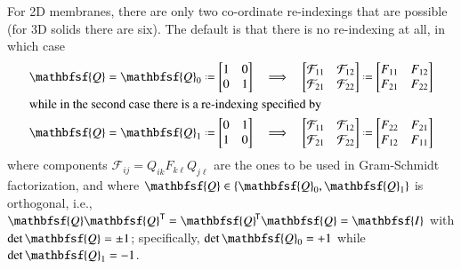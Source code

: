 For 2D membranes, there are only two co-ordinate re-indexings that are possible (for 3D solids there are six).  The default is that there is no re-indexing at all, in which case 
\begin{subequations}
	\label{membraneRelabling}
	\begin{align}
	\mathbfsf{Q} = \mathbfsf{Q}_0 & \defeq 
	\begin{bmatrix} 1 & 0 \\ 0 & 1 \end{bmatrix} & 
	\implies & & \begin{bmatrix}
	\mathcal{F}_{11} & \mathcal{F}_{12} \\
	\mathcal{F}_{21} & \mathcal{F}_{22}
	\end{bmatrix} & \defeq \begin{bmatrix}
	F_{11} & F_{12} \\
	F_{21} & F_{22}
	\end{bmatrix} \label{Q0} \\
	\intertext{while in the second case there is a re-indexing specified by}
	\mathbfsf{Q} = \mathbfsf{Q}_1 & \defeq 
	\begin{bmatrix} 0 & 1 \\ 1 & 0 \end{bmatrix} & 
	\implies & & \begin{bmatrix}
	\mathcal{F}_{11} & \mathcal{F}_{12} \\
	\mathcal{F}_{21} & \mathcal{F}_{22}
	\end{bmatrix} & \defeq \begin{bmatrix}
	F_{22} & F_{21} \\
	F_{12} & F_{11}
	\end{bmatrix}
	\label{Q1}
	\end{align}
\end{subequations}
where components $\mathcal{F}_{ij} = Q_{ik} F_{k\ell} Q_{j\ell}$ are the ones to be used in Gram-Schmidt factorization, and where $\mathbfsf{Q} \in \{ \mathbfsf{Q}_0 , \mathbfsf{Q}_1 \}$ is orthogonal, i.e., $\mathbfsf{Q} \mathbfsf{Q}^{\mathsf{T}} = \mathbfsf{Q}^{\hspace{-1pt}\mathsf{T}} \mathbfsf{Q} = \mathbfsf{I}$ with $\det \mathbfsf{Q} = \pm 1$; specifically, $\det \mathbfsf{Q}_0 = +1$ while $\det \mathbfsf{Q}_1 = -1$.

